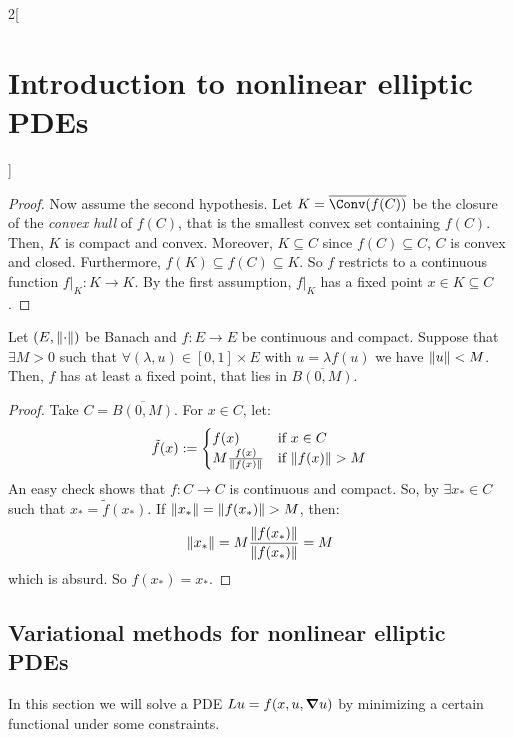 \documentclass[../../../main_math.tex]{subfiles}
\begin{document}
\begin{multicols}{2}[\section{Introduction to nonlinear elliptic PDEs}]
\begin{proof}
    Now assume the second hypothesis. Let $K=\overline{\Conv(f(C))}$ be the closure of the \emph{convex hull} of $f(C)$, that is the smallest convex set containing $f(C)$. Then, $K$ is compact and convex. Moreover, $K\subseteq C$ since $f(C)\subseteq C$, $C$ is convex and closed. Furthermore, $f(K)\subseteq f(C)\subseteq K$. So $f$ restricts to a continuous function $f|_K:K\to K$. By the first assumption, $f|_K$ has a fixed point $x\in K\subseteq C$.
  \end{proof}
  \begin{theorem}\label{INEPDE:schaefer_fixed_point}
    Let $(E, \norm{\cdot})$ be Banach and $f:E\to E$ be continuous and compact. Suppose that $\exists M>0$ such that $\forall (\lambda,u)\in [0,1]\times E$ with $u=\lambda f(u)$ we have $\norm{u}<M$. Then, $f$ has at least a fixed point, that lies in $\overline{B(0,M)}$.
  \end{theorem}
  \begin{proof}
    Take $C=\overline{B(0,M)}$. For $x\in C$, let:
    $$
      \tilde{f}(x):=\begin{cases}
        f(x)                      & \text{if }x\in C        \\
        M\frac{f(x)}{\norm{f(x)}} & \text{if }\norm{f(x)}>M
      \end{cases}
    $$
    An easy check shows that $f:C\to C$ is continuous and compact. So, by  $\exists x_*\in C$ such that $x_*=\tilde{f}(x_*)$. If $\norm{x_*}=\norm{f(x_*)}> M$, then:
    $$
      \norm{x_*}=M\frac{\norm{f(x_*)}}{\norm{f(x_*)}}=M
    $$
    which is absurd. So $f(x_*)=x_*$.
  \end{proof}
  \subsection{Variational methods for nonlinear elliptic PDEs}
  In this section we will solve a PDE $Lu=f(x,u,\grad u)$ by minimizing a certain functional under some constraints.

\end{multicols}
\end{document}
